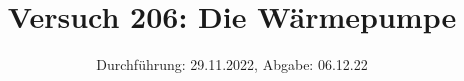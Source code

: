 

\title{Versuch 206: Die Wärmepumpe}
\date{Durchführung: 29.11.2022, Abgabe: 06.12.22}



\maketitle

\tableofcontents
\newpage



\printbibliography

